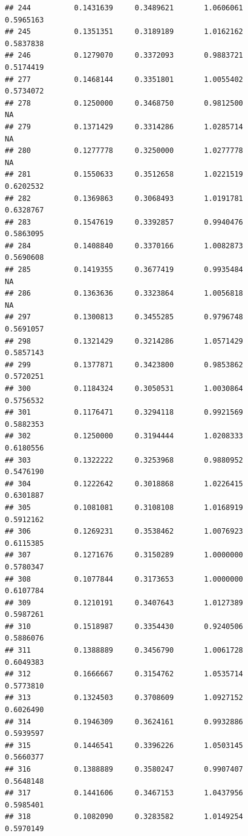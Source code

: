 \documentclass[]{article}
\begin{document}
\begin{verbatim}
## 244          0.1431639     0.3489621       1.0606061          0.5965163
## 245          0.1351351     0.3189189       1.0162162          0.5837838
## 246          0.1279070     0.3372093       0.9883721          0.5174419
## 277          0.1468144     0.3351801       1.0055402          0.5734072
## 278          0.1250000     0.3468750       0.9812500                 NA
## 279          0.1371429     0.3314286       1.0285714                 NA
## 280          0.1277778     0.3250000       1.0277778                 NA
## 281          0.1550633     0.3512658       1.0221519          0.6202532
## 282          0.1369863     0.3068493       1.0191781          0.6328767
## 283          0.1547619     0.3392857       0.9940476          0.5863095
## 284          0.1408840     0.3370166       1.0082873          0.5690608
## 285          0.1419355     0.3677419       0.9935484                 NA
## 286          0.1363636     0.3323864       1.0056818                 NA
## 297          0.1300813     0.3455285       0.9796748          0.5691057
## 298          0.1321429     0.3214286       1.0571429          0.5857143
## 299          0.1377871     0.3423800       0.9853862          0.5720251
## 300          0.1184324     0.3050531       1.0030864          0.5756532
## 301          0.1176471     0.3294118       0.9921569          0.5882353
## 302          0.1250000     0.3194444       1.0208333          0.6180556
## 303          0.1322222     0.3253968       0.9880952          0.5476190
## 304          0.1222642     0.3018868       1.0226415          0.6301887
## 305          0.1081081     0.3108108       1.0168919          0.5912162
## 306          0.1269231     0.3538462       1.0076923          0.6115385
## 307          0.1271676     0.3150289       1.0000000          0.5780347
## 308          0.1077844     0.3173653       1.0000000          0.6107784
## 309          0.1210191     0.3407643       1.0127389          0.5987261
## 310          0.1518987     0.3354430       0.9240506          0.5886076
## 311          0.1388889     0.3456790       1.0061728          0.6049383
## 312          0.1666667     0.3154762       1.0535714          0.5773810
## 313          0.1324503     0.3708609       1.0927152          0.6026490
## 314          0.1946309     0.3624161       0.9932886          0.5939597
## 315          0.1446541     0.3396226       1.0503145          0.5660377
## 316          0.1388889     0.3580247       0.9907407          0.5648148
## 317          0.1441606     0.3467153       1.0437956          0.5985401
## 318          0.1082090     0.3283582       1.0149254          0.5970149

\end{verbatim}
\end{document}
